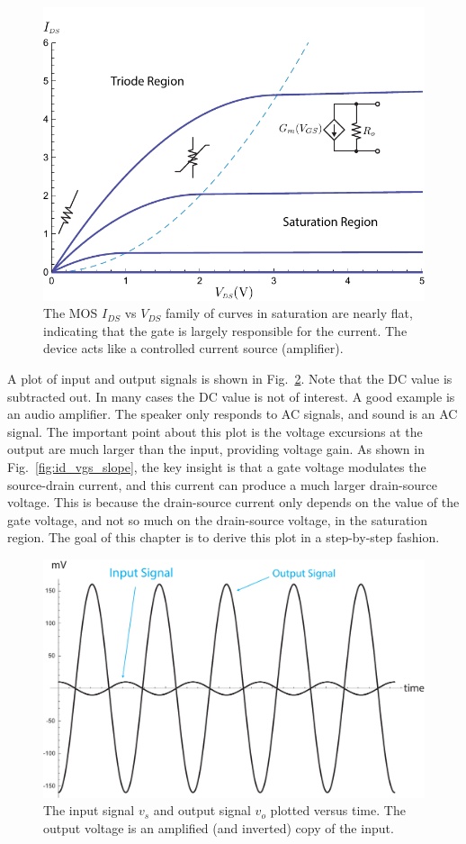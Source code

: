 \begin{figure}[tb]
\begin{center}
\includegraphics[width=.75\columnwidth]{mos_building_block}
\end{center}
\caption{The MOS $I_{DS}$ vs $V_{DS}$ family of curves in saturation are nearly flat, indicating that the gate is largely responsible for the current.  The device acts like a controlled current source (amplifier).} \label{fig:mos_building_block}
\end{figure}


A plot of input and output signals is shown in Fig.~\ref{fig:gain}.  Note that the DC value is subtracted out.  In many cases the DC value is not of interest.  A good example is an audio amplifier.  The speaker only responds to AC signals, and sound is an AC signal.  The important point about this plot is the voltage excursions at the output are much larger than the input, providing voltage gain.   As shown in Fig.~\ref{fig:id_vgs_slope}, the key insight is that a gate voltage modulates the source-drain current, and this current can produce a much larger drain-source voltage.  This is because the drain-source current only depends on the value of the gate voltage, and not so much on the drain-source voltage, in the saturation region. The goal of this chapter is to derive this plot in a step-by-step fashion.


\begin{figure}[tb]
\begin{center}
\includegraphics[width=.75\columnwidth]{gain}
\end{center}
\caption{The input signal $v_s$ and output signal $v_o$ plotted versus time.  The output voltage is an amplified (and inverted) copy of the input. } \label{fig:gain}
\end{figure}

